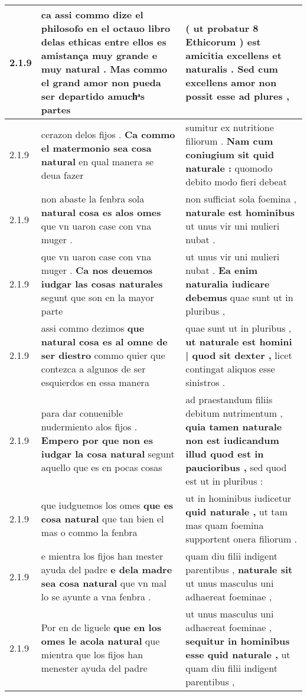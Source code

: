 \begin{tabular}{|p{1cm}|p{6.5cm}|p{6.5cm}|}
2.1.9 & ca assi commo dize el philosofo en el octauo libro delas ethicas \textbf{ entre ellos es amistança muy grande e muy natural . } Mas commo el grand amor non pueda ser departido amuchͣs partes & ( ut probatur 8 Ethicorum ) \textbf{ est amicitia excellens et naturalis . } Sed cum excellens amor non possit esse ad plures , \\\hline
2.1.9 & cerazon delos fijos . \textbf{ Ca commo el matermonio sea cosa natural } en qual manera se deua fazer & sumitur ex nutritione filiorum . \textbf{ Nam cum coniugium sit quid naturale : } quomodo debito modo fieri debeat \\\hline
2.1.9 & non abaste la fenbra sola \textbf{ natural cosa es alos omes } que vn uaron case con vna muger . & non sufficiat sola foemina , \textbf{ naturale est hominibus } ut unus vir uni mulieri nubat . \\\hline
2.1.9 & que vn uaron case con vna muger . \textbf{ Ca nos deuemos iudgar las cosas naturales } segunt que son en la mayor parte & ut unus vir uni mulieri nubat . \textbf{ Ea enim naturalia iudicare debemus } quae sunt ut in pluribus , \\\hline
2.1.9 & assi commo dezimos \textbf{ que natural cosa es al omne de ser diestro } commo quier que contezca a algunos de ser esquierdos en essa manera & quae sunt ut in pluribus , \textbf{ ut naturale est homini | quod sit dexter , } licet contingat aliquos esse sinistros . \\\hline
2.1.9 & para dar conuenible nudermiento alos fijos . \textbf{ Empero por que non es iudgar la cosa natural } segunt aquello que es en pocas cosas & ad praestandum filiis debitum nutrimentum , \textbf{ quia tamen naturale non est iudicandum illud quod est in paucioribus , } sed quod est ut in pluribus : \\\hline
2.1.9 & que iudguemos los omes \textbf{ que es cosa natural } que tan bien el mas o commo la fenbra & ut in hominibus iudicetur \textbf{ quid naturale , } ut tam mas quam foemina supportent onera filiorum . \\\hline
2.1.9 & e mientra los fijos han mester ayuda del padre \textbf{ e dela madre sea cosa natural } que vn mal lo se ayunte a vna fenbra . & quam diu filii indigent parentibus , \textbf{ naturale sit } ut unus masculus uni adhaereat foeminae , \\\hline
2.1.9 & Por en de liguele \textbf{ que en los omes le acola natural } que mientra que los fijos han menester ayuda del padre & ut unus masculus uni adhaereat foeminae , \textbf{ sequitur in hominibus esse quid naturale , } ut quam diu filii indigent parentibus , \\\hline

\end{tabular}
